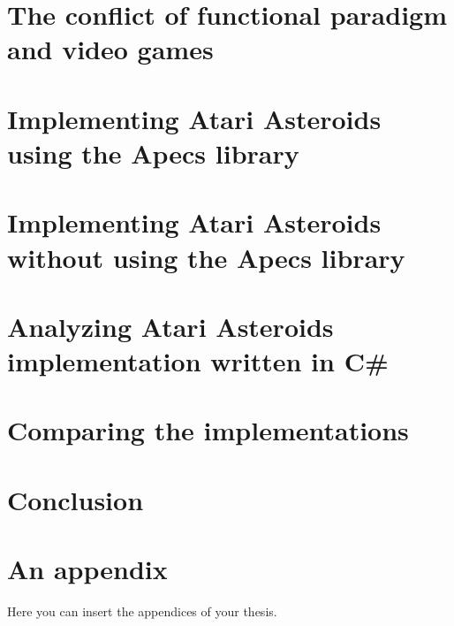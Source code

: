 \documentclass[
  digital, %
  table,   %
  twoside, %
  lof,     %
  lot,     %
]{fithesis3}
\begin{document}


\chapter{The conflict of functional paradigm and video games}


\chapter{Implementing Atari Asteroids using the Apecs library}


\chapter{Implementing Atari Asteroids without using the Apecs library}


\chapter{Analyzing Atari Asteroids implementation written in C\#}


\chapter{Comparing the implementations}



\chapter*{Conclusion}




\printbibliography[heading=bibintoc] %


\makeatletter\thesis@blocks@clear\makeatother
{} %
\printindex


\appendix %
\chapter{An appendix}
Here you can insert the appendices of your thesis.
\end{document}
